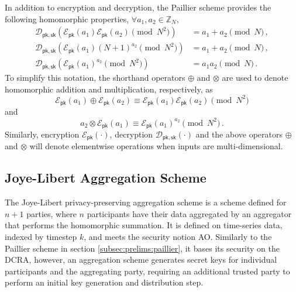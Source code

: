 In addition to encryption and decryption, the Paillier scheme provides the following homomorphic properties, $\forall a_1,a_2 \in \mathbb{Z}_N$,
\begin{align}
    \mathcal{D}_{\mathsf{pk},\mathsf{sk}}\left(\mathcal{E}_{\mathsf{pk}}(a_1)\mathcal{E}_{\mathsf{pk}}(a_2) \pmod{N^2}\right) &= a_1+a_2 \pmod{N}\,, \label{eq:prelims:paillier_hom_add}\\
    \mathcal{D}_{\mathsf{pk},\mathsf{sk}}\left(\mathcal{E}_{\mathsf{pk}}(a_1)(N+1)^{a_2} \pmod{N^2}\right) &= a_1+a_2 \pmod{N}\,, \label{eq:prelims:paillier_hom_add_plain}\\
    \mathcal{D}_{\mathsf{pk},\mathsf{sk}}\left(\mathcal{E}_{\mathsf{pk}}(a_1)^{a_2} \pmod{N^2}\right) &= a_1a_2 \pmod{N}\,. \label{eq:prelims:paillier_hom_mult}
\end{align}
To simplify this notation, the shorthand operators $\oplus$ and $\otimes$ are used to denote homomorphic addition and multiplication, respectively, as
\begin{equation}\label{eq:prelims:paillier_hom_add_op}
    \mathcal{E}_{\mathsf{pk}}(a_1)\oplus\mathcal{E}_{\mathsf{pk}}(a_2) \equiv \mathcal{E}_{\mathsf{pk}}(a_1)\mathcal{E}_{\mathsf{pk}}(a_2) \pmod{N^2}
\end{equation}
and
\begin{equation}\label{eq:prelims:paillier_hom_mult_op}
    a_2\otimes\mathcal{E}_{\mathsf{pk}}(a_1) \equiv \mathcal{E}_{\mathsf{pk}}(a_1)^{a_2} \pmod{N^2}\,.
\end{equation}
Similarly, encryption $\mathcal{E}_{\mathsf{pk}}(\cdot)$, decryption $\mathcal{D}_{\mathsf{pk},\mathsf{sk}}(\cdot)$ and the above operators $\oplus$ and $\otimes$ will denote elementwise operations when inputs are multi-dimensional.

% 
% 

\subsection{Joye-Libert Aggregation Scheme}\label{subsec:prelims:joye_libert_agg}
The Joye-Libert privacy-preserving aggregation scheme \cite{joyeScalableSchemePrivacyPreserving2013} is a scheme defined for $n+1$ parties, where $n$ participants have their data aggregated by an aggregator that performs the homomorphic summation. It is defined on time-series data, indexed by timestep $k$, and meets the security notion AO. Similarly to the Paillier scheme in section \ref{subsec:prelims:paillier}, it bases its security on the DCRA, however, an aggregation scheme generates secret keys for individual participants and the aggregating party, requiring an additional trusted party to perform an initial key generation and distribution step.

